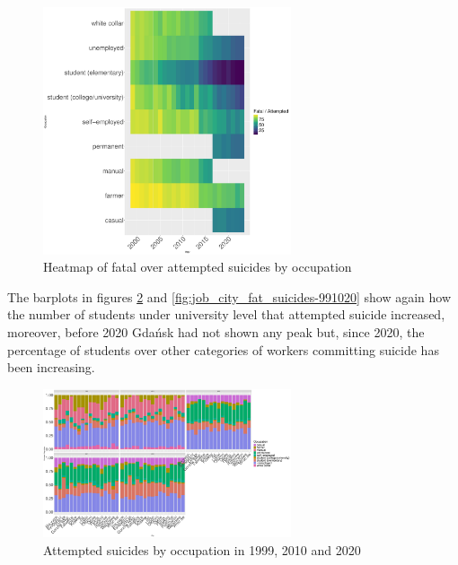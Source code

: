 \documentclass{article}
\begin{document}
\begin{figure}[H]
    \centering
    \includegraphics[width=0.65\textwidth]{imgs/job_foa_heat.pdf}
    \caption{Heatmap of fatal over attempted suicides by occupation}
    \label{fig:job_foa_heat}
\end{figure}
%
%
The barplots in figures \ref{fig:job_city_att_suicides-991020} and 
\ref{fig:job_city_fat_suicides-991020}
show again how the number of students under university level that attempted
suicide increased, moreover, before 2020 Gdańsk had not shown any peak but, 
since 2020, the percentage of students over other categories of workers
committing suicide has been increasing.
\begin{figure}[H]
    \centering
    \includegraphics[width=0.65\textwidth]{imgs/job_city_att_suicides-991020.pdf}
    \caption{Attempted suicides by occupation in 1999, 2010 and 2020}
    \label{fig:job_city_att_suicides-991020}
\end{figure}

\end{document}
